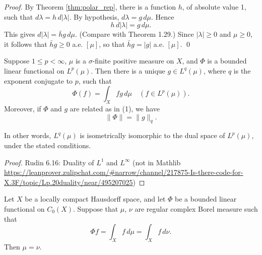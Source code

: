 \begin{proof}
  By Theorem \ref{thm:polar_rep}, there is a function $h$, of absolute value 1, such that $d\lambda = h \, d|\lambda|$. By hypothesis, $d\lambda = g \, d\mu$. Hence
  \[
    h \, d|\lambda| = g \, d\mu.
  \]
  This gives $d|\lambda| = \bar{h}g \, d\mu$. (Compare with Theorem 1.29.)
  Since $|\lambda| \geq 0$ and $\mu \geq 0$, it follows that $\bar{h}g \geq 0$ a.e. $[\mu]$, so that $\bar{h}g = |g|$ a.e. $[\mu]$. \qed
\end{proof}

\begin{theorem}[Rudin 6.16]
  \label{thm:Lp_duality}
  Suppose $1 \leq p < \infty$, $\mu$ is a $\sigma$-finite positive measure on $X$, and $\Phi$ is a bounded linear functional on $L^p(\mu)$. Then there is a unique $g \in L^q(\mu)$, where $q$ is the exponent conjugate to $p$, such that
  \begin{equation}
    \Phi(f) = \int_X fg \, d\mu \quad (f \in L^p(\mu)).
  \end{equation}
  Moreover, if $\Phi$ and $g$ are related as in (1), we have
  \begin{equation}
    \|\Phi\| = \|g\|_q.
  \end{equation}

  In other words, $L^q(\mu)$ is isometrically isomorphic to the dual space of $L^p(\mu)$, under the stated conditions.
\end{theorem}

\begin{proof}
  Rudin 6.16: Duality of $L^1$ and $L^∞$ (not in Mathlib
  \url{https://leanprover.zulipchat.com/#narrow/channel/217875-Is-there-code-for-X.3F/topic/Lp.20duality/near/495207025})
\end{proof}


\begin{lemma}
  \label{lem:rieszMeasure_unique}
  Let $X$ be a locally compact Hausdorff space, and let $\Phi$ be a bounded linear functional on $C_0(X)$.
  Suppose that $\mu$, $\nu$ are regular complex Borel measure such that
  \begin{equation*}
    \Phi f = \int_X f \, d\mu = \int_X f \, d\nu.
  \end{equation*}
  Then \(\mu = \nu\).
\end{lemma}

